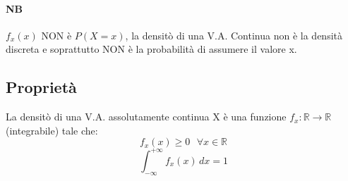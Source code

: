 \documentclass[12pt, a4paper, openany]{book}
\begin{document}
\paragraph{NB} $f_x(x)$ NON è $P(X=x)$, la densitò di una V.A. Continua non è la densità discreta 
e soprattutto NON è la probabilità di assumere il valore x.

\subsection{Proprietà}
La densitò di una V.A. assolutamente continua X è una funzione $f_x:\mathbb{R} \rightarrow \mathbb{R}$ (integrabile)
tale che:
\begin{equation*}
    f_x(x) \geq 0 \textrm{ } \forall x \in  \mathbb{R}
\end{equation*}
\begin{equation*}
    \int_{-\infty}^{+\infty} f_x(x)  \,dx = 1
\end{equation*}
\end{document}
